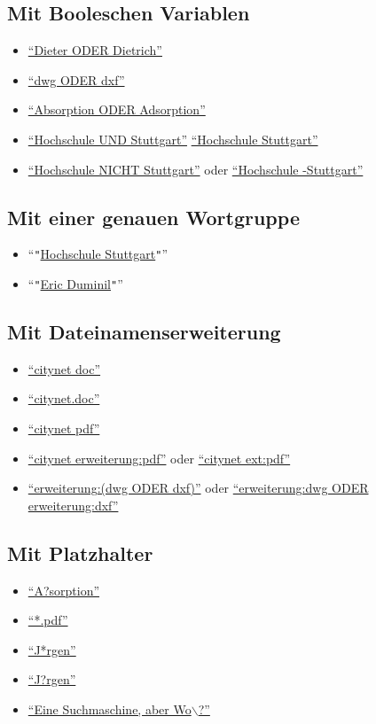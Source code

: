 \documentclass[a4paper,10pt]{article}
\newcommand{\link}{http://myserver.org/documents}
\newcommand{\searchlink}[1]{\href{\link/#1}{``#1''}}
\newcommand{\searchlinkwithquotes}[1]{``\texttt{"}\href{\link/"#1"}{#1}\texttt{"}''}
\begin{document}
\subsection{Mit Booleschen Variablen}

\begin{itemize}
	\item \searchlink{Dieter ODER Dietrich}
        \item \searchlink{dwg ODER dxf}
        \item \searchlink{Absorption ODER Adsorption}
	\item \searchlink{Hochschule UND Stuttgart} \searchlink{Hochschule Stuttgart}
        \item \searchlink{Hochschule NICHT Stuttgart} oder \searchlink{Hochschule -Stuttgart}
\end{itemize}


\subsection{Mit einer genauen Wortgruppe}

\begin{itemize}
	\item \searchlinkwithquotes{Hochschule Stuttgart}
	\item \searchlinkwithquotes{Eric Duminil}
\end{itemize}



\subsection{Mit Dateinamenserweiterung}

\begin{itemize}
	\item \searchlink{citynet doc}
	\item \searchlink{citynet.doc}
	\item \searchlink{citynet pdf}
	\item \searchlink{citynet erweiterung:pdf} oder \searchlink{citynet ext:pdf}
        \item \searchlink{erweiterung:(dwg ODER dxf)} oder \searchlink{erweiterung:dwg ODER erweiterung:dxf}
\end{itemize}

\subsection{Mit Platzhalter}
\begin{itemize}
        \item \href{\link/a\%3Fsorption}{``A?sorption''}
        \item \searchlink{*.pdf}
        \item \searchlink{J*rgen}
        \item \href{\link/J\%3Frgen}{``J?rgen''}
        \item \href{\link/Eine+Suchmaschine\%2C+aber+Wo\%5C\%3F}{``Eine Suchmaschine, aber Wo$\backslash$?''}
\end{itemize}
\end{document}
